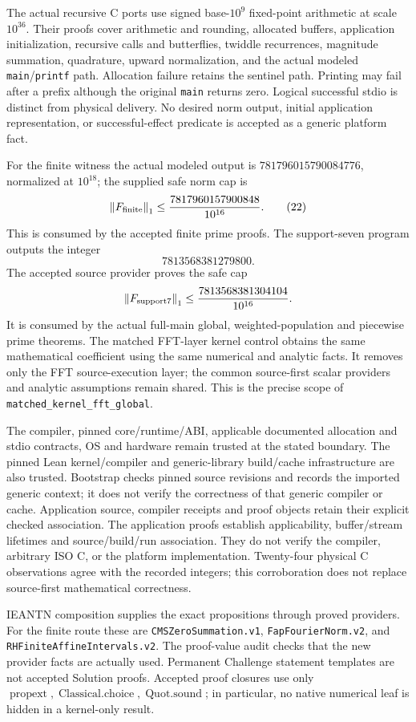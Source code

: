 \documentclass[11pt]{article}
\newcommand{\norm}[1]{\left\lVert#1\right\rVert}
\begin{document}
The actual recursive C ports use signed base-\(10^9\) fixed-point arithmetic
at scale \(10^{36}\). Their proofs cover arithmetic and rounding, allocated
buffers, application initialization, recursive calls and butterflies, twiddle
recurrences, magnitude summation, quadrature, upward normalization, and the
actual modeled \texttt{main}/\texttt{printf} path. Allocation failure retains
the sentinel path. Printing may fail after a prefix although the original
\texttt{main} returns zero. Logical successful stdio is distinct from physical
delivery. No desired norm output, initial application representation, or
successful-effect predicate is accepted as a generic platform fact.

For the finite witness the actual modeled output is
\(781796015790084776\), normalized at \(10^{18}\); the supplied safe norm cap is
\[
 \norm{F_{\rm finite}}_1\le
 \frac{7817960157900848}{10^{16}}.
 \tag{22}
\]
This is consumed by the accepted finite prime proofs.
The support-seven program outputs the integer
\[
 7813568381279800.
\]
The accepted source provider proves the safe cap
\[
 \norm{F_{\rm support7}}_1\le \frac{7813568381304104}{10^{16}}.
\]
It is consumed by the actual full-main global, weighted-population and
piecewise prime theorems. The matched FFT-layer kernel control obtains the same mathematical
coefficient using the same numerical and analytic facts. It removes only
the FFT source-execution layer; the common source-first scalar providers
and analytic assumptions remain shared. This is the precise scope of
\texttt{matched\_kernel\_fft\_global}.

The compiler, pinned core/runtime/ABI, applicable documented allocation and
stdio contracts, OS and hardware remain trusted at the stated boundary.
The pinned Lean kernel/compiler and generic-library build/cache
infrastructure are also trusted. Bootstrap checks pinned source revisions and
records the imported generic context; it does not verify the correctness of
that generic compiler or cache. Application source, compiler receipts and
proof objects retain their explicit checked association.
The application proofs establish applicability, buffer/stream lifetimes and
source/build/run association. They do not verify the compiler, arbitrary ISO C,
or the platform implementation. Twenty-four physical C observations agree with
the recorded integers; this corroboration does not replace source-first
mathematical correctness.

IEANTN composition supplies the exact propositions through proved providers.
For the finite route these are \texttt{CMSZeroSummation.v1},
\texttt{FapFourierNorm.v2}, and \texttt{RHFiniteAffineIntervals.v2}.
The proof-value audit checks that the new provider facts are actually used.
Permanent Challenge statement templates are not accepted Solution proofs.
Accepted proof closures use only
\(\operatorname{propext},\operatorname{Classical.choice},\operatorname{Quot.sound}\);
in particular, no native numerical leaf is hidden in a kernel-only result.
\end{document}
